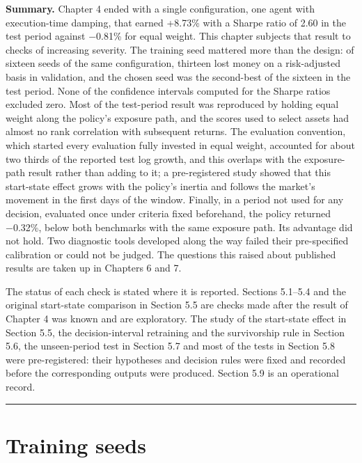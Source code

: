 \documentclass[12pt,a4paper]{report}
\begin{document}
\textbf{Summary.} Chapter 4 ended with a single configuration, one agent
with execution-time damping, that earned +8.73\% with a Sharpe ratio of
2.60 in the test period against −0.81\% for equal weight. This chapter
subjects that result to checks of increasing severity. The training seed
mattered more than the design: of sixteen seeds of the same
configuration, thirteen lost money on a risk-adjusted basis in
validation, and the chosen seed was the second-best of the sixteen in
the test period. None of the confidence intervals computed for the
Sharpe ratios excluded zero. Most of the test-period result was
reproduced by holding equal weight along the policy's exposure path, and
the scores used to select assets had almost no rank correlation with
subsequent returns. The evaluation convention, which started every
evaluation fully invested in equal weight, accounted for about two
thirds of the reported test log growth, and this overlaps with the
exposure-path result rather than adding to it; a pre-registered study
showed that this start-state effect grows with the policy's inertia and
follows the market's movement in the first days of the window. Finally,
in a period not used for any decision, evaluated once under criteria
fixed beforehand, the policy returned −0.32\%, below both benchmarks
with the same exposure path. Its advantage did not hold. Two diagnostic
tools developed along the way failed their pre-specified calibration or
could not be judged. The questions this raised about published results
are taken up in Chapters 6 and 7.

The status of each check is stated where it is reported. Sections
5.1--5.4 and the original start-state comparison in Section 5.5 are
checks made after the result of Chapter 4 was known and are exploratory.
The study of the start-state effect in Section 5.5, the
decision-interval retraining and the survivorship rule in Section 5.6,
the unseen-period test in Section 5.7 and most of the tests in Section
5.8 were pre-registered: their hypotheses and decision rules were fixed
and recorded before the corresponding outputs were produced. Section 5.9
is an operational record.

\begin{center}\rule{0.5\linewidth}{0.5pt}\end{center}

\section{Training seeds}\label{training-seeds}
\end{document}
